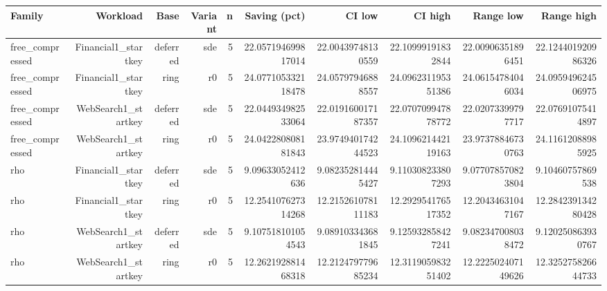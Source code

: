 \begin{tabular}{lrrrrrrrrr}
\toprule
Family & Workload & Base & Variant & n & Saving (pct) & CI low & CI high & Range low & Range high \\
\midrule
free\_compressed & Financial1\_startkey & deferred & sde & 5 & 22.057194699817014 & 22.00439748130559 & 22.10999191832844 & 22.00906351896451 & 22.124401920986326 \\
free\_compressed & Financial1\_startkey & ring & r0 & 5 & 24.077105332118478 & 24.05797946888557 & 24.096231195351386 & 24.06154784046034 & 24.095949624506975 \\
free\_compressed & WebSearch1\_startkey & deferred & sde & 5 & 22.044934982533064 & 22.019160017187357 & 22.070709947878772 & 22.02073399797717 & 22.07691075414897 \\
free\_compressed & WebSearch1\_startkey & ring & r0 & 5 & 24.042280808181843 & 23.974940174244523 & 24.109621442119163 & 23.97378846730763 & 24.11612088985925 \\
rho & Financial1\_startkey & deferred & sde & 5 & 9.09633052412636 & 9.082352814445427 & 9.110308233807293 & 9.077078570823804 & 9.10460757869538 \\
rho & Financial1\_startkey & ring & r0 & 5 & 12.254107627314268 & 12.215261078111183 & 12.292954176517352 & 12.20434631047167 & 12.284239134280428 \\
rho & WebSearch1\_startkey & deferred & sde & 5 & 9.107518101054543 & 9.089103343681845 & 9.125932858427241 & 9.082347008038472 & 9.120250863930767 \\
rho & WebSearch1\_startkey & ring & r0 & 5 & 12.262192881468318 & 12.212479779685234 & 12.311905983251402 & 12.222502407149626 & 12.325275826644733 \\
\bottomrule
\end{tabular}
